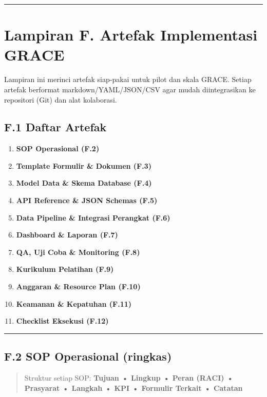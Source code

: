 \documentclass[
  letterpaper,
  DIV=11,
  numbers=noendperiod]{scrartcl}
\providecommand{\tightlist}{%
  \setlength{\itemsep}{0pt}\setlength{\parskip}{0pt}}
\begin{document}
\begin{center}\rule{0.5\linewidth}{0.5pt}\end{center}

\section{Lampiran F. Artefak Implementasi
GRACE}\label{lampiran-f.-artefak-implementasi-grace}

Lampiran ini merinci artefak siap‑pakai untuk pilot dan skala GRACE.
Setiap artefak berformat markdown/YAML/JSON/CSV agar mudah
diintegrasikan ke repositori (Git) dan alat kolaborasi.

\subsection{F.1 Daftar Artefak}\label{f.1-daftar-artefak}

\begin{enumerate}
\def\labelenumi{\arabic{enumi}.}
\tightlist
\item
  \textbf{SOP Operasional (F.2)}
\item
  \textbf{Template Formulir \& Dokumen (F.3)}
\item
  \textbf{Model Data \& Skema Database (F.4)}
\item
  \textbf{API Reference \& JSON Schemas (F.5)}
\item
  \textbf{Data Pipeline \& Integrasi Perangkat (F.6)}
\item
  \textbf{Dashboard \& Laporan (F.7)}
\item
  \textbf{QA, Uji Coba \& Monitoring (F.8)}
\item
  \textbf{Kurikulum Pelatihan (F.9)}
\item
  \textbf{Anggaran \& Resource Plan (F.10)}
\item
  \textbf{Keamanan \& Kepatuhan (F.11)}
\item
  \textbf{Checklist Eksekusi (F.12)}
\end{enumerate}

\begin{center}\rule{0.5\linewidth}{0.5pt}\end{center}

\subsection{F.2 SOP Operasional
(ringkas)}\label{f.2-sop-operasional-ringkas}

\begin{quote}
Struktur setiap SOP: \textbf{Tujuan • Lingkup • Peran (RACI) • Prasyarat
• Langkah • KPI • Formulir Terkait • Catatan}
\end{quote}
\end{document}
